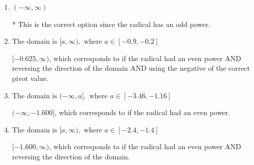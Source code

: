 \documentclass{extbook}[14pt]
\begin{document}
\begin{enumerate}
{\begin{enumerate}[label=\Alph*.]
$(-\infty, -0.625]$, which corresponds to if the radical had an even power AND using the negative of the correct pivot value.
\item \( (-\infty, \infty) \)

* This is the correct option since the radical has an odd power.
\item \( \text{The domain is } [a, \infty), \text{   where } a \in [-0.9, -0.2] \)

$[-0.625, \infty)$, which corresponds to if the radical had an even power AND reversing the direction of the domain AND using the negative of the correct pivot value.
\item \( \text{The domain is } (-\infty, a], \text{   where } a \in [-3.46, -1.16] \)

$(-\infty, -1.600]$, which corresponds to if the radical had an even power.
\item \( \text{The domain is } [a, \infty), \text{   where } a \in [-2.4, -1.4] \)

$[-1.600, \infty)$, which corresponds to if the radical had an even power AND reversing the direction of the domain.
\end{enumerate}

}
\end{enumerate}
\end{document}
